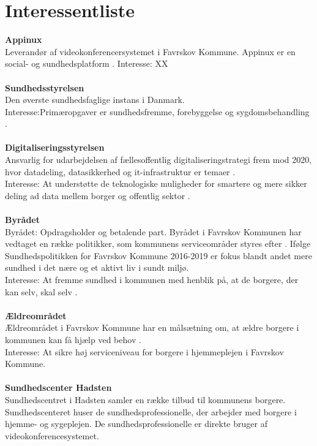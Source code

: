 \documentclass[10pt,a4paper]{article}
\begin{document}
	\section{Interessentliste}
	\textbf{Appinux}\\
	Leverandør af videokonferencersystemet i Favrskov Kommune. Appinux er en social- og sundhedsplatform \cite{appinuxwebsite}.
	Interesse: XX \\ \\
	\textbf{Sundhedsstyrelsen}\\
	Den øverste sundhedsfaglige instans i Danmark.\\ Interesse:Primæropgaver er sundhedsfremme, forebyggelse og sygdomsbehandling \cite{sstyr}.\\ \\
	\textbf{Digitaliseringsstyrelsen}\\
	Ansvarlig for udarbejdelsen af fællesoffentlig digitaliseringstrategi frem mod 2020, hvor datadeling, datasikkerhed og it-infrastruktur er temaer \cite{digst1}.\\
	Interesse: At understøtte de teknologiske muligheder for smartere og mere sikker deling ad data mellem borger og offentlig sektor \cite{digst2}.\\ \\
	\textbf{Byrådet}\\
	Byrådet: Opdragsholder og betalende part. Byrådet i Favrskov Kommunen har vedtaget en række politikker, som kommunens serviceområder styres efter \cite{favrskovkommune}. Ifølge Sundhedspolitikken for Favrskov Kommune 2016-2019 er fokus blandt andet mere sundhed i det nære og et aktivt liv i sundt miljø.\\
	Interesse: At fremme sundhed i kommunen med henblik på, at de borgere, der kan selv, skal selv \cite{favrskovkommune2}.\\ \\
	\textbf{Ældreområdet}\\
	Ældreområdet i Favrskov Kommune har en målsætning om, at ældre borgere i kommunen kan få hjælp ved behov \cite{favrskovkommune3}.\\
	Interesse: At sikre høj serviceniveau for borgere i hjemmeplejen i Favrskov Kommune. \\ \\
	\textbf{Sundhedscenter Hadsten}\\
	Sundhedscentret i Hadsten samler en række tilbud til kommunens borgere. Sundhedscenteret huser de sundhedsprofessionelle, der arbejder med borgere i hjemme- og sygeplejen. De sundhedsprofessionelle er direkte bruger af videokonferencesystemet.\\
\end{document}
